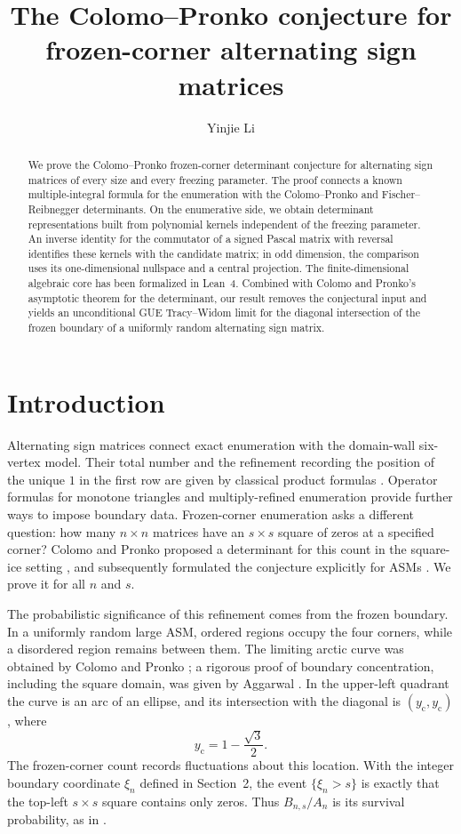 \documentclass[11pt,a4paper]{amsart}
\title[The Colomo--Pronko conjecture]{The Colomo--Pronko conjecture for frozen-corner alternating sign matrices}
\author{Yinjie Li}
\date{}
\theoremstyle{remark}\newtheorem{remark}[theorem]{Remark}
\numberwithin{equation}{section}
\begin{document}
\begin{abstract}
We prove the Colomo--Pronko frozen-corner determinant conjecture for alternating sign matrices of every size and every freezing parameter. The proof connects a known multiple-integral formula for the enumeration with the Colomo--Pronko and Fischer--Reibnegger determinants. On the enumerative side, we obtain determinant representations built from polynomial kernels independent of the freezing parameter. An inverse identity for the commutator of a signed Pascal matrix with reversal identifies these kernels with the candidate matrix; in odd dimension, the comparison uses its one-dimensional nullspace and a central projection. The finite-dimensional algebraic core has been formalized in Lean~4. Combined with Colomo and Pronko's asymptotic theorem for the determinant, our result removes the conjectural input and yields an unconditional GUE Tracy--Widom limit for the diagonal intersection of the frozen boundary of a uniformly random alternating sign matrix.
\end{abstract}
\maketitle
\enlargethispage{2pt}

\section{Introduction}
Alternating sign matrices connect exact enumeration with the domain-wall six-vertex model. Their total number and the refinement recording the position of the unique $1$ in the first row are given by classical product formulas \cite{Z,Ku,Zref}. Operator formulas for monotone triangles \cite{Fischer} and multiply-refined enumeration \cite{Behrend} provide further ways to impose boundary data. Frozen-corner enumeration asks a different question: how many $n\times n$ matrices have an $s\times s$ square of zeros at a specified corner? Colomo and Pronko proposed a determinant for this count in the square-ice setting \cite{CP24}, and subsequently formulated the conjecture explicitly for ASMs \cite[Conjecture~1]{CP}. We prove it for all $n$ and $s$.

The probabilistic significance of this refinement comes from the frozen boundary. In a uniformly random large ASM, ordered regions occupy the four corners, while a disordered region remains between them. The limiting arctic curve was obtained by Colomo and Pronko \cite{CPshape}; a rigorous proof of boundary concentration, including the square domain, was given by Aggarwal \cite{Agg}. In the upper-left quadrant the curve is an arc of an ellipse, and its intersection with the diagonal is $(y_{\mathrm c},y_{\mathrm c})$, where
\[
 y_{\mathrm c}=1-\frac{\sqrt3}{2}.
\]
The frozen-corner count records fluctuations about this location. With the integer boundary coordinate $\xi_n$ defined in Section~2, the event $\{\xi_n>s\}$ is exactly that the top-left $s\times s$ square contains only zeros. Thus $B_{n,s}/A_n$ is its survival probability, as in \cite[(4.3)]{CP}.
\end{document}
